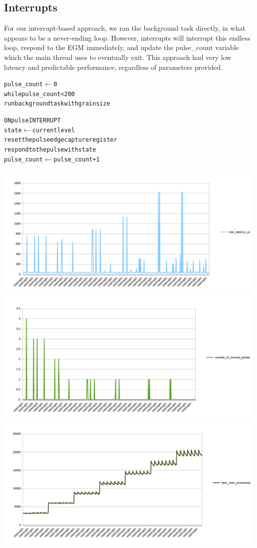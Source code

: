 \documentclass[12pt]{article}
\begin{document}
\subsection{Interrupts}
For our interrupt-based approach, we ran the background task directly, in what
appears to be a never-ending loop. However, interrupts will interrupt this
endless loop, respond to the EGM immediately, and update the pulse\_count
variable which the main thread uses to eventually exit. This approach had very
low latency and predictable performance, regardless of parameters provided.

\begin{alltt}
pulse_count \(\gets\) 0
while pulse_count < 200
    run background task with grain size

ON pulse INTERRUPT
    state \(\gets\) current level
    reset the pulse edge capture register
    respond to the pulse with state
    pulse_count \(\gets\) pulse_count + 1
\end{alltt}

\includegraphics[width=\textwidth]{interrupts_max_latency.png}
\includegraphics[width=\textwidth]{interrupts_missed_pulses.png}
\includegraphics[width=\textwidth]{interrupts_units_processed.png}
\end{document}
